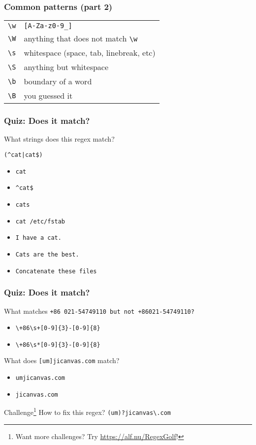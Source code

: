 \begin{frame}[fragile]
\frametitle{Common patterns (part 2)}
\begin{table}
    \centering
    \begin{tabular}{ll}
        \verb|\w|           & \verb|[A-Za-z0-9_]| \\
        \verb|\W|           & anything that does not match \verb|\w| \\
        \verb|\s|           & whitespace (space, tab, linebreak, etc) \\
        \verb|\S|           & anything but whitespace \\
        \verb|\b|           & boundary of a word \\
        \verb|\B|           & you guessed it
    \end{tabular}
\end{table}
\end{frame}

\begin{frame}[fragile]
\frametitle{Quiz: Does it match?}
What strings does this regex match? \newline

\Large \verb!(^cat|cat$)! \normalsize

\begin{itemize}
    \item \verb|cat|                      %
    \item \verb|^cat$|                    %
    \item \verb|cats|                     %
    \item \verb|cat /etc/fstab|           %
    \item \verb|I have a cat.|            %
    \item \verb|Cats are the best.|       %
    \item \verb|Concatenate these files|  %
\end{itemize}
\end{frame}

\begin{frame}[fragile]
\frametitle{Quiz: Does it match?}
What matches \tt{+86 021-54749110} but not \tt{+86021-54749110}?
\begin{itemize}
    \item \verb|\+86\s+[0-9]{3}-[0-9]{8}|
    \item \verb|\+86\s*[0-9]{3}-[0-9]{8}| %
\end{itemize}

What does \Large \verb|[um]jicanvas.com| \normalsize match?
\begin{itemize}
    \item \tt{umjicanvas.com}
    \item \tt{jicanvas.com} %
\end{itemize}

\begin{block}{Challenge\footnote{Want more challenges? Try \url{https://alf.nu/RegexGolf}!}}
    How to fix this regex? \pause \verb|(um)?jicanvas\.com|
\end{block}
\end{frame}

